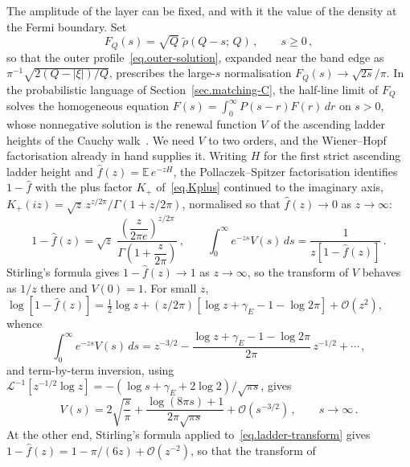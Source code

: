 \documentclass[11pt,a4paper]{article}
\theoremstyle{definition}
\begin{document}
The amplitude of the layer can be fixed, and with it the value of the density at
the Fermi boundary.  Set
\begin{equation}\label{eq.edge-scaling}
  F_Q(s) = \sqrt{Q}\;\tilde\rho(Q-s;\,Q)\,,
  \qquad s \geq 0\,,
\end{equation}
so that the outer profile~\eqref{eq.outer-solution}, expanded near the band edge
as $\pi^{-1}\sqrt{2(Q-|\xi|)/Q}$, prescribes the large-$s$ normalisation
$F_Q(s) \to \sqrt{2s}/\pi$.  In the probabilistic language of Section~\ref{sec.matching-C}, the half-line
limit of $F_Q$ solves the homogeneous equation
$F(s) = \int_0^{\infty}P(s-r)F(r)\,dr$ on $s>0$, whose nonnegative solution is
the renewal function $V$ of the ascending ladder heights of the Cauchy
walk~\cite{Spitzer1957}.  We need $V$ to two orders, and the Wiener--Hopf
factorisation already in hand supplies it.  Writing $H$ for the first strict
ascending ladder height and $\hat f(z) = \mathbb{E}\,e^{-zH}$, the
Pollaczek--Spitzer factorisation identifies $1-\hat f$ with the plus factor
$K_+$ of~\eqref{eq.Kplus} continued to the imaginary axis,
$K_+(iz) = \sqrt{z}\,z^{z/2\pi}/\Gamma(1+z/2\pi)$, normalised so that
$\hat f(z)\to 0$ as $z\to\infty$:
\begin{equation}\label{eq.ladder-transform}
  1 - \hat f(z)
  = \sqrt{z}\;
    \frac{\left(\dfrac{z}{2\pi e}\right)^{z/2\pi}}
         {\Gamma \left(1+\dfrac{z}{2\pi}\right)}\,,
  \qquad
  \int_0^{\infty}e^{-zs}V(s)\,ds = \frac{1}{z\left[1-\hat f(z)\right]}\,.
\end{equation}
Stirling's formula gives $1-\hat f(z) \to 1$ as $z \to \infty$, so the transform
of $V$ behaves as $1/z$ there and $V(0) = 1$.  For small $z$,
$\log[1-\hat f(z)] = \frac12\log z
+ (z/2\pi)\left[\log z + \gamma_E - 1 - \log 2\pi\right] + \mathcal O(z^2)$,
whence
\begin{equation}
  \int_0^{\infty}e^{-zs}V(s)\,ds
  = z^{-3/2} - \frac{\log z + \gamma_E - 1 - \log 2\pi}{2\pi}\,z^{-1/2}
  + \cdots\,,
\end{equation}
and term-by-term inversion, using
$\mathcal{L}^{-1}[z^{-1/2}\log z] = -(\log s + \gamma_E + 2\log 2)/\sqrt{\pi s}$,
gives
\begin{equation}\label{eq.V-expansion}
  V(s) = 2\sqrt{\frac{s}{\pi}}
  + \frac{\log(8\pi s) + 1}{2\pi\sqrt{\pi s}}
  + \mathcal O(s^{-3/2})\,,
  \qquad s \to \infty\,.
\end{equation}
At the other end, Stirling's formula applied to~\eqref{eq.ladder-transform}
gives $1-\hat f(z) = 1 - \pi/(6z) + \mathcal O(z^{-2})$, so that the transform of
\end{document}
